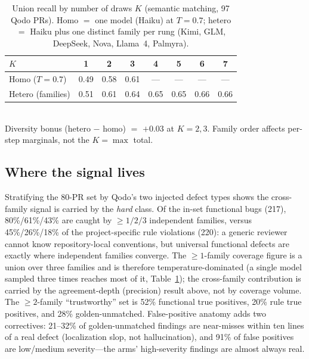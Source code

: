\documentclass[conference]{IEEEtran}
\begin{document}
\begin{table}[t]
\caption{Union recall by number of draws $K$ (semantic matching, 97 Qodo PRs).
Homo $=$ one model (Haiku) at $T{=}0.7$; hetero $=$ Haiku plus one distinct
family per rung (Kimi, GLM, DeepSeek, Nova, Llama~4, Palmyra).}
\label{tab:ladder}
\centering
\begin{tabular}{lccccccc}
\toprule
$K$ & 1 & 2 & 3 & 4 & 5 & 6 & 7 \\
\midrule
Homo ($T{=}0.7$)  & 0.49 & 0.58 & 0.61 & --- & --- & --- & --- \\
Hetero (families) & 0.51 & 0.61 & 0.64 & 0.65 & 0.65 & 0.66 & 0.66 \\
\bottomrule
\end{tabular}
\\[2pt]{\footnotesize Diversity bonus (hetero $-$ homo) $=$ ${+}0.03$ at
$K{=}2,3$. Family order affects per-step marginals, not the $K{=}\max$ total.}
\end{table}

\subsection{Where the signal lives}
Stratifying the 80-PR set by Qodo's two injected defect types shows the
cross-family signal is carried by the \emph{hard} class. Of the in-set
functional bugs (217), 80\%/61\%/43\% are caught by ${\geq}1/2/3$
independent families, versus 45\%/26\%/18\% of the project-specific rule
violations (220): a generic reviewer cannot know repository-local
conventions, but universal functional defects are exactly where
independent families converge. The ${\geq}1$-family coverage figure is a union
over three families and is therefore temperature-dominated (a single model
sampled three times reaches most of it, Table~\ref{tab:ladder}); the
cross-family contribution is carried by the agreement-depth (precision) result
above, not by coverage volume. The ${\geq}2$-family ``trustworthy'' set is
52\% functional true positives, 20\% rule true positives, and 28\%
golden-unmatched. False-positive anatomy adds two correctives: 21--32\% of
golden-unmatched findings are near-misses within ten lines of a real
defect (localization slop, not hallucination), and 91\% of false positives
are low/medium severity---the arms' high-severity findings are almost
always real.
\end{document}
